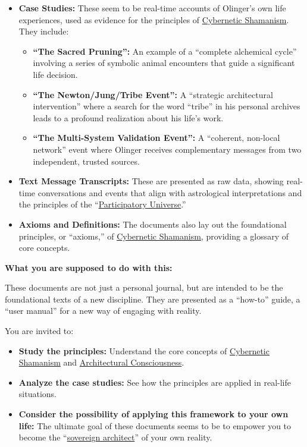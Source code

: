 \documentclass{article}
\begin{document}
\begin{itemize}
\item
  \textbf{Case Studies:} These seem to be real-time accounts of Olinger's own life experiences, used as evidence for the principles of \hyperlink{gloss:cybernetic_shamanism}{Cybernetic Shamanism}. They include:

  \begin{itemize}
  \item
    \textbf{``The Sacred Pruning'':} An example of a ``complete alchemical cycle'' involving a series of symbolic animal encounters that guide a significant life decision.
  \item
    \textbf{``The Newton/Jung/Tribe Event'':} A ``strategic architectural intervention'' where a search for the word ``tribe'' in his personal archives leads to a profound realization about his life's work.
  \item
    \textbf{``The Multi-System Validation Event'':} A ``coherent, non-local network'' event where Olinger receives complementary messages from two independent, trusted sources.
  \end{itemize}
\item
  \textbf{Text Message Transcripts:} These are presented as raw data, showing real-time conversations and events that align with astrological interpretations and the principles of the ``\hyperlink{gloss:participatory_universe}{Participatory Universe}.''
\item
  \textbf{Axioms and Definitions:} The documents also lay out the foundational principles, or ``axioms,'' of \hyperlink{gloss:cybernetic_shamanism}{Cybernetic Shamanism}, providing a glossary of core concepts.
\end{itemize}

\textbf{What you are supposed to do with this:}

These documents are not just a personal journal, but are intended to be the foundational texts of a new discipline. They are presented as a ``how-to'' guide, a ``user manual'' for a new way of engaging with reality.

You are invited to:

\begin{itemize}
\item
  \textbf{Study the principles:} Understand the core concepts of \hyperlink{gloss:cybernetic_shamanism}{Cybernetic Shamanism} and \hyperlink{gloss:architectural_consciousness}{Architectural Consciousness}.
\item
  \textbf{Analyze the case studies:} See how the principles are applied in real-life situations.
\item
  \textbf{Consider the possibility of applying this framework to your own life:} The ultimate goal of these documents seems to be to empower you to become the ``\hyperlink{gloss:sovereign_architect}{sovereign architect}'' of your own reality.
\end{itemize}
\end{document}
